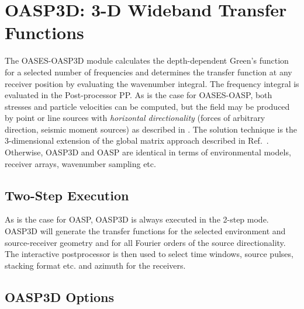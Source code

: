 \section{OASP3D: 3-D Wideband Transfer Functions}


    The OASES-OASP3D module calculates the depth-dependent  Green's 
function for a selected number of frequencies and determines  the 
transfer function at any receiver position by evaluating  the 
wavenumber  integral. The frequency integral is evaluated in the
Post-processor PP.  
As is  the 
case for OASES-OASP, both stresses and particle velocities can be 
computed, but the field may be produced by point or line 
sources  with  {\em horizontal  directionality}  (forces  of  arbitrary 
direction, seismic moment sources) as described in \cite{jkim}. The
solution technique is 
the 3-dimensional extension of the global matrix approach
described in Ref.~\cite{sg:jasa85}.   
Otherwise, OASP3D and OASP are identical in terms of environmental
models, receiver arrays, wavenumber sampling etc. 

\subsection{Two-Step Execution}

    As is the case for OASP, OASP3D  is  always 
executed  in the 2-step mode. OASP3D will generate  the  transfer 
functions  for  the  selected  environment  and   source-receiver 
geometry and for all Fourier orders of the source directionality. 
The  interactive  postprocessor  is  then  used  to  select  time 
windows, source pulses, stacking format etc. and azimuth for  the 
receivers.

\subsection{OASP3D Options}

